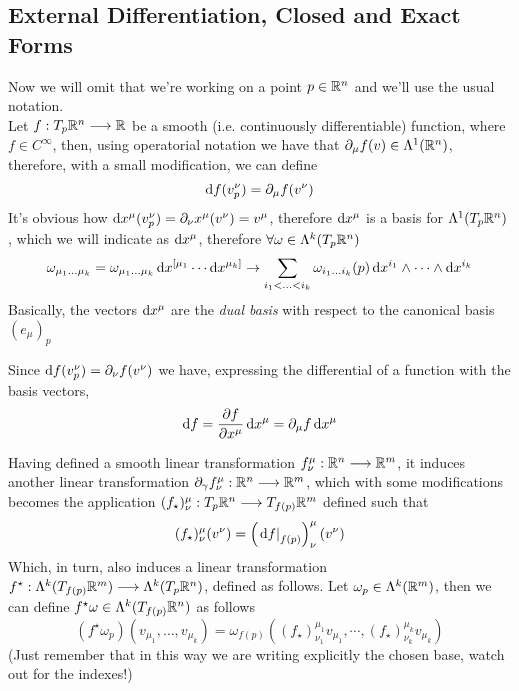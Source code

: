 \documentclass[../complete.tex]{subfiles}
\begin{document}
\subsection{External Differentiation, Closed and Exact Forms}
\begin{dfn}[Differential]
	Now we will omit that we're working on a point $p\in\mathbb{R}^n$ and we'll use the usual notation.\\
	Let $f:T_p\mathbb{R}^n\overset{}{\longrightarrow}\mathbb{R}$ be a smooth (i.e. continuously differentiable) function, where $f\in C^\infty$, then, using operatorial notation we have that $\partial_\mu f(v)\in\Lambda^1(\mathbb{R}^n)$, therefore, with a small modification, we can define
	\begin{equation}
		\diff f(v^\nu_p)=\del_\mu f(v^\nu)
		\label{eq:differential1}
	\end{equation}
	It's obvious how $\operatorname{d\!} x^\mu(v^\nu_p)=\partial_\nu x^\mu(v^\nu)=v^\mu$, therefore $\operatorname{d\!} x^\mu$ is a basis for $\Lambda^1(T_p\mathbb{R}^n)$, which we will indicate as $\operatorname{d\!} x^\mu$, therefore $\forall\omega\in\Lambda^k(T_p\mathbb{R}^n)$
	\begin{equation}
		\omega_{\mu_1\ldots\mu_k}=\omega_{\mu_1\ldots\mu_k}\diff x^{[\mu_1}\cdots\diff x^{\mu_k]}\to\sum_{i_1<\ldots<i_k}\omega_{i_1\ldots i_k}(p)\diff x^{i_1}\wedge\cdots\wedge\diff x^{i_k}
		\label{eq:difform2}
	\end{equation}
	Basically, the vectors $\operatorname{d\!} x^\mu$ are the \textit{dual basis} with respect to the canonical basis $(e_\mu)_p$
\end{dfn}
\begin{thm}
	Since $\operatorname{d\!} f(v^\nu_p)=\partial_\nu f(v^\nu)$ we have, expressing the differential of a function with the basis vectors,
	\begin{equation}
		\diff f=\pdv{f}{x^\mu}\diff x^\mu=\del_\mu f\diff x^\mu
		\label{eq:funcdiff}
	\end{equation}
\end{thm}
\begin{dfn}
	Having defined a smooth linear transformation $f^\mu_\nu:\mathbb{R}^n\overset{}{\longrightarrow}\mathbb{R}^m$, it induces another linear transformation $\partial_{\gamma}f^\mu_\nu:\mathbb{R}^n\overset{}{\longrightarrow}\mathbb{R}^m$, which with some modifications becomes the application $(f_\star)^\mu_\nu:T_p\mathbb{R}^n\overset{}{\longrightarrow} T_{f(p)}\mathbb{R}^m$ defined such that
	\begin{equation}
		(f_\star)^\mu_\nu(v^\nu)=\left(\derin[f(p)]{\diff f}\right)^\mu_\nu(v^\nu)
		\label{eq:fstarlowsmooth}
	\end{equation}
	Which, in turn, also induces a linear transformation $f^\star:\Lambda^k(T_{f(p)}\mathbb{R}^m)\overset{}{\longrightarrow}\Lambda^k(T_p\mathbb{R}^n)$, defined as follows. Let $\omega_p\in\Lambda^k(\mathbb{R}^m)$, then we can define $f^\star\omega\in\Lambda^k(T_{f(p)}\mathbb{R}^n)$ as follows
	\begin{equation}
		(f^\star\omega_p)(v_{\mu_1},\ldots,v_{\mu_k})=\omega_{f(p)}\left( (f_\star)^{\mu_1}_{\nu_1}v_{\mu_1},\cdots,(f_\star)^{\mu_k}_{\nu_k}v_{\mu_k}\right)
		\label{eq:fstaromega}
	\end{equation}
	(Just remember that in this way we are writing explicitly the chosen base, watch out for the indexes!)
\end{dfn}
\end{document}
